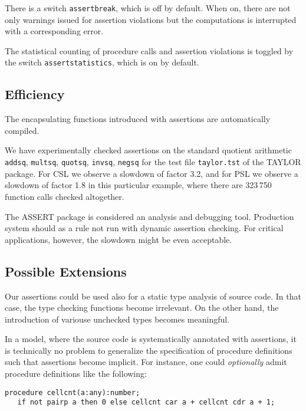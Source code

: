 There is a switch \texttt{assertbreak}, which is off by default. When
on, there are not only warnings issued for assertion violations but the
computations is interrupted with a corresponding error.

The statistical counting of procedure calls and assertion violations is
toggled by the switch \texttt{assertstatistics}, which is on by default.

\subsection{Efficiency}
The encapsulating functions introduced with assertions are automatically
compiled.






We have experimentally checked assertions on the standard quotient
arithmetic \texttt{addsq}, \texttt{multsq}, \texttt{quotsq},
\texttt{invsq}, \texttt{negsq} for the test file \texttt{taylor.tst} of
the TAYLOR package. For CSL we observe a slowdown of factor 3.2, and for
PSL we observe a slowdown of factor 1.8 in this particular example,
where there are 323\,750 function calls checked altogether.

The ASSERT package is considered an analysis and debugging tool.
Production system should as a rule not run with dynamic assertion
checking. For critical applications, however, the slowdown might be
even acceptable.

\subsection{Possible Extensions}
Our assertions could be used also for a static type analysis of source
code. In that case, the type checking functions become irrelevant. On
the other hand, the introduction of variouse unchecked types becomes
meaningful.

In a model, where the source code is systematically annotated with
assertions, it is technically no problem to generalize the specification
of procedure definitions such that assertions become implicit. For
instance, one could \emph{optionally} admit procedure definitions like
the following:
\begin{verbatim}
procedure cellcnt(a:any):number;
   if not pairp a then 0 else cellcnt car a + cellcnt cdr a + 1;
\end{verbatim}

